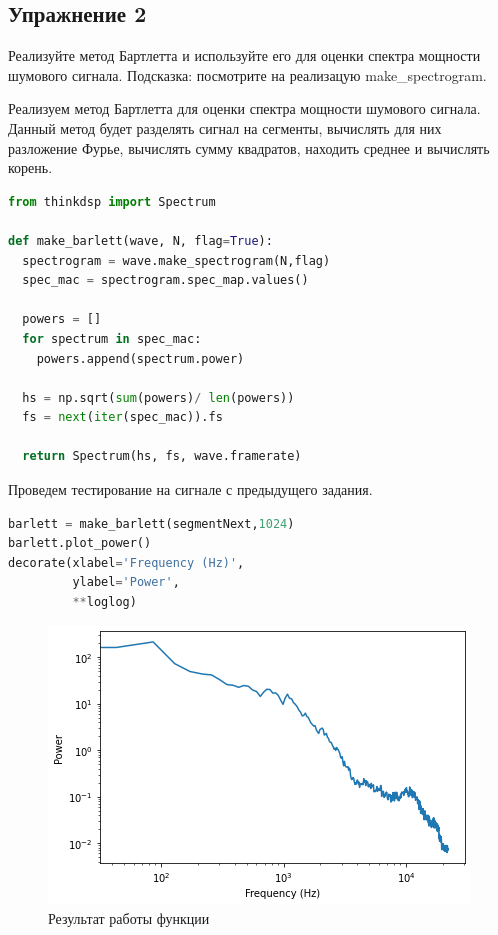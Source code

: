 \subsection{Упражнение 2}

Реализуйте метод Бартлетта\cite{barlett} и используйте его для оценки спектра мощности шумового сигнала. Подсказка: посмотрите на реализацую make\_spectrogram.

Реализуем метод Бартлетта для оценки спектра мощности шумового сигнала. Данный метод будет разделять сигнал на сегменты, вычислять для них разложение Фурье, вычислять сумму квадратов, находить среднее и вычислять корень.


\begin{lstlisting}[language=Python]
from thinkdsp import Spectrum

def make_barlett(wave, N, flag=True):
  spectrogram = wave.make_spectrogram(N,flag)
  spec_mac = spectrogram.spec_map.values()

  powers = []
  for spectrum in spec_mac:
    powers.append(spectrum.power)
  
  hs = np.sqrt(sum(powers)/ len(powers))
  fs = next(iter(spec_mac)).fs

  return Spectrum(hs, fs, wave.framerate)
\end{lstlisting}

Проведем тестирование на сигнале с предыдущего задания.

\begin{lstlisting}[language=Python]
barlett = make_barlett(segmentNext,1024)
barlett.plot_power()
decorate(xlabel='Frequency (Hz)', 
         ylabel='Power', 
         **loglog)
\end{lstlisting}

\begin{figure}[H]
	\begin{center}
		\includegraphics[scale=1]{fig/lab04/lab4_4.png}
		\caption{Результат работы функции}
	\end{center}
\end{figure}



